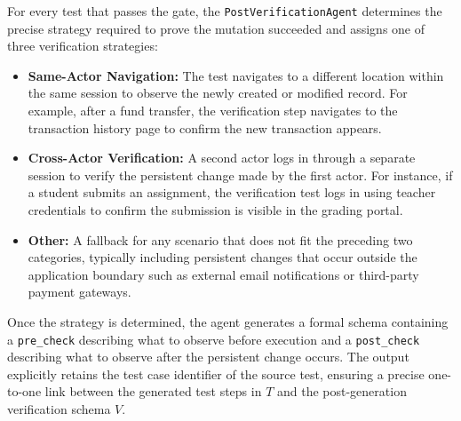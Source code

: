 For every test that passes the gate, the \texttt{PostVerificationAgent} determines the precise strategy required to prove the mutation succeeded and assigns one of three verification strategies:

\begin{itemize}
    \item \textbf{Same-Actor Navigation:} The test navigates to a different location within the same session to observe the newly created or modified record. For example, after a fund transfer, the verification step navigates to the transaction history page to confirm the new transaction appears.
    \item \textbf{Cross-Actor Verification:} A second actor logs in through a separate session to verify the persistent change made by the first actor. For instance, if a student submits an assignment, the verification test logs in using teacher credentials to confirm the submission is visible in the grading portal.
    \item \textbf{Other:} A fallback for any scenario that does not fit the preceding two categories, typically including persistent changes that occur outside the application boundary such as external email notifications or third-party payment gateways.
\end{itemize}

Once the strategy is determined, the agent generates a formal schema containing a \texttt{pre\_check} describing what to observe before execution and a \texttt{post\_check} describing what to observe after the persistent change occurs. The output explicitly retains the test case identifier of the source test, ensuring a precise one-to-one link between the generated test steps in $T$ and the post-generation verification schema $V$.
